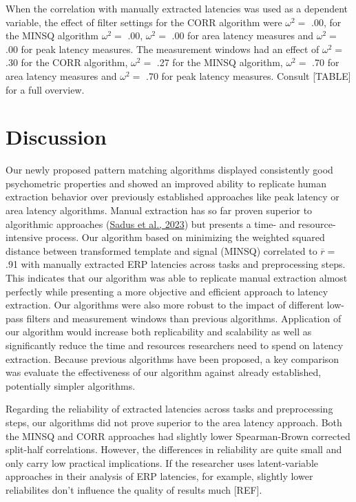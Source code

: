 \documentclass[
  man]{apa7}
\begin{document}
When the correlation with manually extracted latencies was used as a dependent variable, the effect of filter settings for the CORR algorithm were \(\omega^2 =\) .00, for the MINSQ algorithm \(\omega^2 =\) .00, \(\omega^2 =\) .00 for area latency measures and \(\omega^2 =\) .00 for peak latency measures. The measurement windows had an effect of \(\omega^2 =\) .30 for the CORR algorithm, \(\omega^2 =\) .27 for the MINSQ algorithm, \(\omega^2 =\) .70 for area latency measures and \(\omega^2 =\) .70 for peak latency measures. Consult {[}TABLE{]} for a full overview.

\hypertarget{discussion}{%
\section{Discussion}\label{discussion}}

Our newly proposed pattern matching algorithms displayed consistently good psychometric properties and showed an improved ability to replicate human extraction behavior over previously established approaches like peak latency or area latency algorithms. Manual extraction has so far proven superior to algorithmic approaches (\protect\hyperlink{ref-sadus2023multiverse}{Sadus et al., 2023}) but presents a time- and resource-intensive process. Our algorithm based on minimizing the weighted squared distance between transformed template and signal (MINSQ) correlated to \(\overline{r} =\) .91 with manually extracted ERP latencies across tasks and preprocessing steps. This indicates that our algorithm was able to replicate manual extraction almost perfectly while presenting a more objective and efficient approach to latency extraction. Our algorithms were also more robust to the impact of different low-pass filters and measurement windows than previous algorithms. Application of our algorithm would increase both replicability and scalability as well as significantly reduce the time and resources researchers need to spend on latency extraction. Because previous algorithms have been proposed, a key comparison was evaluate the effectiveness of our algorithm against already established, potentially simpler algorithms.

Regarding the reliability of extracted latencies across tasks and preprocessing steps, our algorithms did not prove superior to the area latency approach. Both the MINSQ and CORR approaches had slightly lower Spearman-Brown corrected split-half correlations. However, the differences in reliability are quite small and only carry low practical implications. If the researcher uses latent-variable approaches in their analysis of ERP latencies, for example, slightly lower reliabilites don't influence the quality of results much {[}REF{]}.
\end{document}
